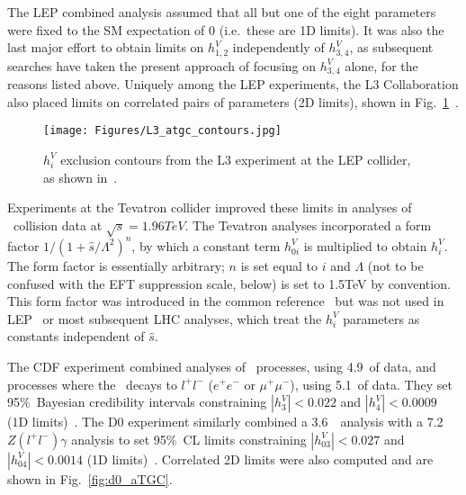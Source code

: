 The LEP combined analysis assumed that all but one of the eight parameters were fixed to the SM expectation of 0 (i.e.\ these are 1D limits).
It was also the last major effort to obtain limits on $h_{1,2}^{V}$ independently of $h_{3,4}^{V}$,
as subsequent searches have taken the present approach of focusing on $h_{3,4}^{V}$ alone, for the reasons listed above.
Uniquely among the LEP experiments, the L3 Collaboration also placed limits on correlated pairs of parameters (2D limits), shown in Fig.~\ref{fig:L3_atgc_contours}~\cite{ref:j.physletb.2004.07.002}.

\begin{figure}[hbtp]
  \begin{center}
    \texttt{[image: Figures/L3\_atgc\_contours.jpg]}
    \caption{
      $h_{i}^{V}$ exclusion contours from the L3 experiment at the LEP collider, as shown in~\cite{ref:j.physletb.2004.07.002}.
    }
    \label{fig:L3_atgc_contours}
  \end{center}
\end{figure}

Experiments at the Tevatron collider improved these limits in analyses of \Pp\Pap\ collision data at $\sqrt{s} = 1.96\unit{TeV}$.
The Tevatron analyses incorporated a form factor $1 / (1 + \hat{s}/\Lambda^{2})^{n}$, by which a constant term $h_{0i}^{V}$ is
multiplied to obtain $h_{i}^{V}$.
The form factor is essentially arbitrary; $n$ is set equal to $i$ and $\Lambda$ (not to be confused with the EFT suppression scale, below)
is set to 1.5\unit{TeV} by convention. This form factor was introduced in the common reference~\cite{ref:PhysRevD.47.4889} but was not used in LEP~\cite{ref:j.physrep.2013.07.004}
or most subsequent LHC analyses, which treat the $h_{i}^{V}$ parameters as constants independent of $\hat{s}$.

The CDF experiment combined analyses of \zinvg\ processes, using 4.9\fbinv\ of data, and processes where the \PZ\ decays to
$l^\mathrm{+}l^\mathrm{-}$ ($e^\mathrm{+}e^\mathrm{-}$ or $\mu^\mathrm{+}\mu^\mathrm{-}$), using 5.1\fbinv\ of data.
They set 95\%\ Bayesian credibility intervals constraining $|h_{3}^{V}| < 0.022$ and $|h_{4}^{V}| < 0.0009$ (1D limits)~\cite{ref:PhysRevLett.107.051802}.
The D0 experiment similarly combined a 3.6\fbinv\ \zinvg\ analysis with a 7.2\fbinv\ $Z(l^\mathrm{+}l^\mathrm{-})\gamma$
analysis to set 95\%\ CL limits constraining
$|h_{03}^{V}| < 0.027$ and $|h_{04}^{V}| < 0.0014$ (1D limits)~\cite{ref:PhysRevD.85.052001}. Correlated 2D limits were also
computed and are shown in Fig.~\ref{fig:d0_aTGC}.

